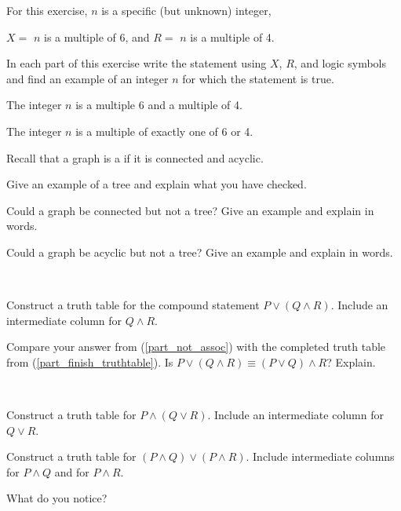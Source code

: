 \begin{exer}[\exerP] %
\label{exer_translate_into_and_or}
    For this exercise, $n$ is a specific (but unknown) integer,       
        \begin{center}
            $X=$ $n$ is a multiple of 6, and $R=$ $n$ is a multiple of 4.
        \end{center}  
    In each part of this exercise write the statement using $X$, $R$, and logic symbols and find an example of an integer $n$ for which the statement is true. 
        \begin{exerpart}
            \item The integer $n$ is a multiple 6 and a multiple of 4.
            \item The integer $n$ is a multiple of exactly one of 6 or 4.
        \end{exerpart}
\end{exer}

\begin{exer}[\exerU] %
    Recall that a graph is a  if it is connected and acyclic. 
        \begin{exerpart}
            \item Give an example of a tree and explain what you have checked.
            \item Could a graph be connected but not a tree?  Give an example and explain in words.
            \item Could a graph be acyclic but not a tree?  Give an example and explain in words.
    \end{exerpart}
\end{exer}

\begin{exer}[\exerU]
\label{exer_not_assoc}  
~
    \begin{exerpart}
        \item \label{part_not_assoc} Construct a truth table for the compound statement $P \lor (Q \land R)$.  Include an intermediate column for $Q \land R$.
        \item Compare your answer from (\ref{part_not_assoc}) with the completed truth table from  (\ref{part_finish_truthtable}). Is $P \lor (Q \land R) \equiv (P \lor Q) \land R$?  Explain.
    \end{exerpart}
\end{exer}

\begin{exer}[\exerU] %
\label{exer_truthtable_distributive}
~
    \begin{exerpart}
        \item Construct a truth table for $P \land (Q \lor R)$.  Include an intermediate column for $Q \lor R$.
        \item Construct a truth table for $(P \land Q) \lor (P \land R)$. Include intermediate columns for $P \land Q$ and for $P \land R$.
        \item What do you notice? %
    \end{exerpart} 
\end{exer}

